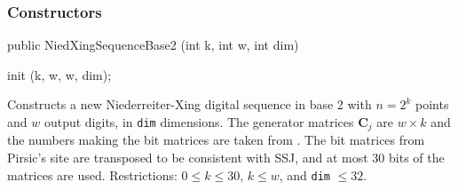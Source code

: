 \subsubsection* {Constructors}
\begin{code} 

   public NiedXingSequenceBase2 (int k, int w, int dim) \begin{hide} {
      init (k, w, w, dim);
   } 
\end{hide}
\end{code} 
\begin{tabb}
    Constructs a new Niederreiter-Xing digital sequence in base 2 
    with $n = 2^k$ points and $w$ output digits, in \texttt{dim} dimensions.
    The generator matrices $\mathbf{C}_j$ are $w\times k$ and
    the numbers making the bit matrices are taken from
   .
  The bit matrices from Pirsic's site are transposed to be consistent with SSJ,
  and at most 30 bits of the matrices are used. 
    Restrictions: $0\le k\le 30$, $k\le w$, and \texttt{dim} $\le 32$.
\end{tabb}
\begin{htmlonly}
\end{htmlonly}
